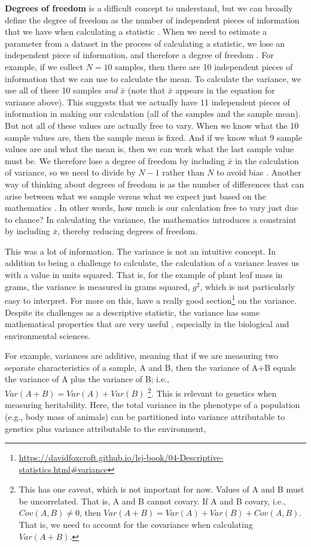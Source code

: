 \documentclass[
  openany]{krantz}
\renewcommand{\href}[2]{#2\footnote{\url{#1}}}
\begin{document}
\textbf{Degrees of freedom} is a difficult concept to understand, but we can broadly define the degree of freedom as the number of independent pieces of information that we have when calculating a statistic \citep{Grafen2002, Upton2014}.
When we need to estimate a parameter from a dataset in the process of calculating a statistic, we lose an independent piece of information, and therefore a degree of freedom \citep{Pandey2008}.
For example, if we collect \(N = 10\) samples, then there are 10 independent pieces of information that we can use to calculate the mean.
To calculate the variance, we use all of these 10 samples \emph{and} \(\bar{x}\) (note that \(\bar{x}\) appears in the equation for variance above).
This suggests that we actually have 11 independent pieces of information in making our calculation (all of the samples and the sample mean).
But not all of these values are actually free to vary.
When we know what the 10 sample values are, then the sample mean is fixed.
And if we know what 9 sample values are and what the mean is, then we can work what the last sample value must be.
We therefore lose a degree of freedom by including \(\bar{x}\) in the calculation of variance, so we need to divide by \(N - 1\) rather than \(N\) to avoid bias \citep{Wardlaw1985, Fowler1998}.
Another way of thinking about degrees of freedom is as the number of differences that can arise between what we sample versus what we expect just based on the mathematics \citep{Fryer1966}.
In other words, how much is our calculation free to vary just due to chance?
In calculating the variance, the mathematics introduces a constraint by including \(\bar{x}\), thereby reducing degrees of freedom.

This was a lot of information.
The variance is not an intuitive concept.
In addition to being a challenge to calculate, the calculation of a variance leaves us with a value in units squared.
That is, for the example of plant leaf mass in grams, the variance is measured in grams squared, \(g^{2}\), which is not particularly easy to interpret.
For more on this, \citet{Navarro2022} have a really good \href{https://davidfoxcroft.github.io/lsj-book/04-Descriptive-statistics.html\#variance}{section} on the variance.
Despite its challenges as a descriptive statistic, the variance has some mathematical properties that are very useful \citep{Navarro2022}, especially in the biological and environmental sciences.

For example, variances are additive, meaning that if we are measuring two separate characteristics of a sample, A and B, then the variance of A+B equals the variance of A plus the variance of B; i.e., \(Var(A + B) = Var(A) + Var(B)\) \footnote{This has one caveat, which is not important for now. Values of A and B must be uncorrelated. That is, A and B cannot covary. If A and B covary, i.e., \(Cov(A, B) \neq 0\), then \(Var(A+B) = Var(A) + Var(B) + Cov(A, B)\). That is, we need to account for the covariance when calculating \(Var(A+B)\).}.
This is relevant to genetics when measuring heritability.
Here, the total variance in the phenotype of a population (e.g., body mass of animals) can be partitioned into variance attributable to genetics plus variance attributable to the environment,
\end{document}
